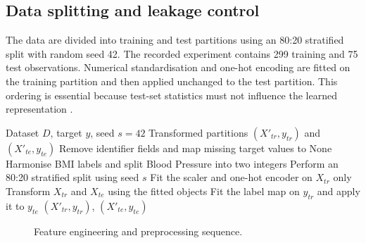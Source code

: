 ﻿\documentclass[preprint,12pt]{elsarticle}
\begin{document}
\subsection{Data splitting and leakage control}
The data are divided into training and test partitions using an 80:20 stratified split with random seed 42. The recorded experiment contains 299 training and 75 test observations. Numerical standardisation and one-hot encoding are fitted on the training partition and then applied unchanged to the test partition. This ordering is essential because test-set statistics must not influence the learned representation \cite{riley2021,kapoor2023}.

\begin{algorithm}[t]
\caption{Leakage-safe data preparation}
\label{alg:prep}
\begin{algorithmic}[1]
\Require Dataset $D$, target $y$, seed $s=42$
\Ensure Transformed partitions $(X'_{tr},y_{tr})$ and $(X'_{te},y_{te})$
\State Remove identifier fields and map missing target values to None
\State Harmonise BMI labels and split Blood Pressure into two integers
\State Perform an 80:20 stratified split using seed $s$
\State Fit the scaler and one-hot encoder on $X_{tr}$ only
\State Transform $X_{tr}$ and $X_{te}$ using the fitted objects
\State Fit the label map on $y_{tr}$ and apply it to $y_{te}$
\State \Return $(X'_{tr},y_{tr})$, $(X'_{te},y_{te})$
\end{algorithmic}
\end{algorithm}

\begin{figure}[t]
\centering
{}
\caption{Feature engineering and preprocessing sequence.}
\label{fig:preprocess}
\end{figure}
\end{document}
